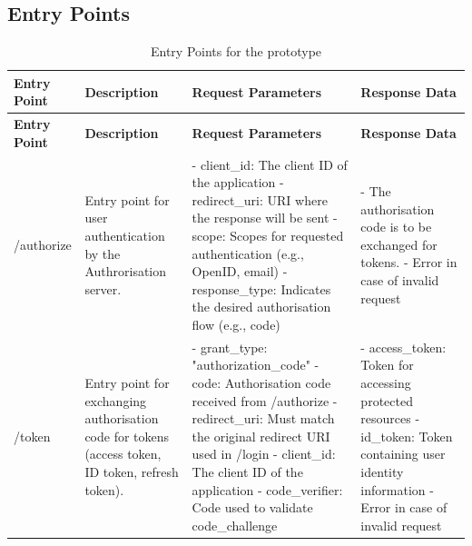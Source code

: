 \subsection{Entry Points}
\begin{longtable}{|p{3cm}|p{4cm}|p{4cm}|p{4cm}|}
\caption{Entry Points for the prototype}
\label{table:threat_model_entry_points}
\hline
\rowcolor{grey!15}
\textbf{Entry Point} & \textbf{Description} & \textbf{Request Parameters} & \textbf{Response Data} \\
\hline
\endfirsthead
\hline
\rowcolor{grey!15}
\textbf{Entry Point} & \textbf{Description} & \textbf{Request Parameters} & \textbf{Response Data} \\
\hline
\endhead
\endfoot
\hline
\endlastfoot

/authorize & Entry point for user authentication by the Authrorisation server.  & 
- client\_id: The client ID of the application \newline 
- redirect\_uri: URI where the response will be sent \newline
- scope: Scopes for requested authentication (e.g., OpenID, email) \newline 
- response\_type: Indicates the desired authorisation flow (e.g., code) \citep{openid_docs} & 
- The authorisation code is to be exchanged for tokens. \newline 
- Error in case of invalid request \\
\hline

/token & Entry point for exchanging authorisation code for tokens (access token, ID token, refresh token). & 
- grant\_type: "authorization\_code" \newline 
- code: Authorisation code received from /authorize \newline
- redirect\_uri: Must match the original redirect URI used in /login \newline 
- client\_id: The client ID of the application
- code\_verifier: Code used to validate code\_challenge \citep{openid_docs}& 
- access\_token: Token for accessing protected resources \newline 
- id\_token: Token containing user identity information \newline 
- Error in case of invalid request \\
\hline

\end{longtable}

